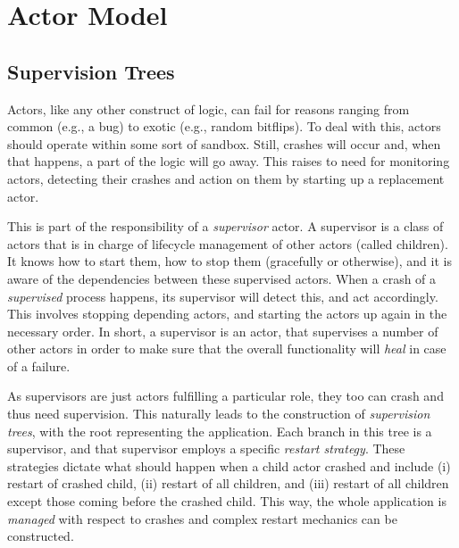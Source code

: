 \section{Actor Model}




\subsection{Supervision Trees}

Actors, like any other construct of logic, can fail for reasons ranging from common (e.g., a bug) to exotic (e.g., random bitflips). To deal with this, actors should operate within some sort of sandbox. Still, crashes will occur and, when that happens, a part of the logic will go away. This raises to need for monitoring actors, detecting their crashes and action on them by starting up a replacement actor.

This is part of the responsibility of a \textsl{supervisor} actor. A supervisor is a class of actors that is in charge of lifecycle management of other actors (called children). It knows how to start them, how to stop them (gracefully or otherwise), and it is aware of the dependencies between these supervised actors. When a crash of a \textsl{supervised} process happens, its supervisor will detect this, and act accordingly. This involves stopping depending actors, and starting the actors up again in the necessary order. In short, a supervisor is an actor, that supervises a number of other actors in order to make sure that the overall functionality will \textsl{heal} in case of a failure.

As supervisors are just actors fulfilling a particular role, they too can crash and thus need supervision. This naturally leads to the construction of \textsl{supervision trees}, with the root representing the application. Each branch in this tree is a supervisor, and that supervisor employs a specific \textsl{restart strategy}. These strategies dictate what should happen when a child actor crashed and include (i) restart of crashed child, (ii) restart of all children, and (iii) restart of all children except those coming before the crashed child. This way, the whole application is \textsl{managed} with respect to crashes and complex restart mechanics can be constructed.


